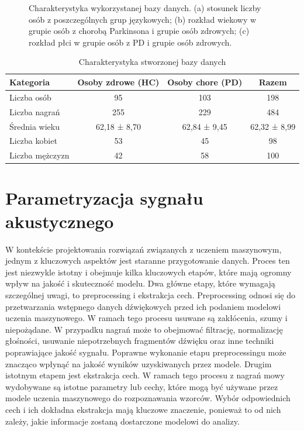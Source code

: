 \begin{figure}
    \caption{Charakterystyka wykorzystanej bazy danych. (a) stosunek liczby osób z poszczególnych grup językowych;
        (b) rozkład wiekowy w grupie osób z chorobą Parkinsona i grupie osób zdrowych; (c) rozkład płci w grupie osób z PD i grupie osób zdrowych.}
    \label{fig:charakterystyka-bazy}
\end{figure}



\begin{table}[h]
\centering
\caption{Charakterystyka stworzonej bazy danych}
\label{tab:summary-database}
\begin{tabular}{|l|c|c|c|}
\hline
\textbf{Kategoria} &\textbf{Osoby zdrowe (HC)} &\textbf{Osoby chore (PD)} &\textbf{Razem} \\ \hline
Liczba osób &95 &103 &198\\ \hline
Liczba nagrań &255 &229 &484\\ \hline
Średnia wieku & 62,18 ± 8,70 & 62,84 ± 9,45  & 62,32 ± 8,99 \\ \hline
Liczba kobiet &53 &45 &98\\ \hline
Liczba mężczyzn &42 &58 &100 \\ \hline
\end{tabular}
\end{table}

\section{Parametryzacja sygnału akustycznego}
\label{sec:parametryzacja-sygnalu-akustycznego}

W kontekście projektowania rozwiązań związanych z uczeniem maszynowym, jednym z kluczowych aspektów jest staranne przygotowanie danych.
Proces ten jest niezwykle istotny i obejmuje kilka kluczowych etapów, które mają ogromny wpływ na jakość i skuteczność modelu.
Dwa główne etapy, które wymagają szczególnej uwagi, to preprocessing i ekstrakcja cech.
Preprocessing odnosi się do przetwarzania wstępnego danych dźwiękowych przed ich podaniem modelowi uczenia maszynowego.
W ramach tego procesu usuwane są zakłócenia, szumy i niepożądane.
W przypadku nagrań może to obejmować filtrację, normalizację głośności, usuwanie niepotrzebnych fragmentów dźwięku oraz inne techniki poprawiające jakość sygnału.
Poprawne wykonanie etapu preprocessingu może znacząco wpłynąć na  jakość wyników uzyskiwanych przez modele.
Drugim istotnym etapem jest ekstrakcja cech.
W ramach tego procesu z nagrań mowy wydobywane są istotne parametry lub cechy, które mogą być używane przez modele uczenia maszynowego do rozpoznawania wzorców.
Wybór odpowiednich cech i ich dokładna ekstrakcja mają kluczowe znaczenie, ponieważ to od nich zależy, jakie informacje zostaną dostarczone modelowi do analizy.

